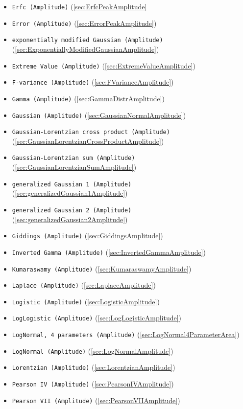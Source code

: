 \begin{itemize}
\begin{itemize}
\begin{itemize}
    \item \texttt{Erfc (Amplitude)} (\ref{sec:ErfcPeakAmplitude}
    \item \texttt{Error (Amplitude)} (\ref{sec:ErrorPeakAmplitude})
    \item \texttt{exponentially modified Gaussian (Amplitude)} (\ref{sec:ExponentiallyModifiedGaussianAmplitude})
    \item \texttt{Extreme Value (Amplitude)} (\ref{sec:ExtremeValueAmplitude})
    \item \texttt{F-variance (Amplitude)} (\ref{sec:FVarianceAmplitude})
    \item \texttt{Gamma (Amplitude)} (\ref{sec:GammaDistrAmplitude})
    \item \texttt{Gaussian (Amplitude)} (\ref{sec:GaussianNormalAmplitude})
    \item \texttt{Gaussian-Lorentzian cross product (Amplitude)} (\ref{sec:GaussianLorentzianCrossProductAmplitude})
    \item \texttt{Gaussian-Lorentzian sum (Amplitude)} (\ref{sec:GaussianLorentzianSumAmplitude})
    \item \texttt{generalized Gaussian 1 (Amplitude)} (\ref{sec:generalizedGaussian1Amplitude})
    \item \texttt{generalized Gaussian 2 (Amplitude)} (\ref{sec:generalizedGaussian2Amplitude})
    \item \texttt{Giddings (Amplitude)} (\ref{sec:GiddingsAmplitude})
    \item \texttt{Inverted Gamma (Amplitude)} (\ref{sec:InvertedGammaAmplitude})
    \item \texttt{Kumaraswamy (Amplitude)} (\ref{sec:KumaraswamyAmplitude})
    \item \texttt{Laplace (Amplitude)} (\ref{sec:LaplaceAmplitude})
    \item \texttt{Logistic (Amplitude)} (\ref{sec:LogisticAmplitude})
    \item \texttt{LogLogistic (Amplitude)} (\ref{sec:LogLogisticAmplitude})
    \item \texttt{LogNormal, 4 parameters (Amplitude)} (\ref{sec:LogNormal4ParameterArea})
    \item \texttt{LogNormal (Amplitude)} (\ref{sec:LogNormalAmplitude})
    \item \texttt{Lorentzian (Amplitude)} (\ref{sec:LorentzianAmplitude})
    \item \texttt{Pearson IV (Amplitude)} (\ref{sec:PearsonIVAmplitude})
    \item \texttt{Pearson VII (Amplitude)} (\ref{sec:PearsonVIIAmplitude})

\end{itemize}
\end{itemize}
\end{itemize}
